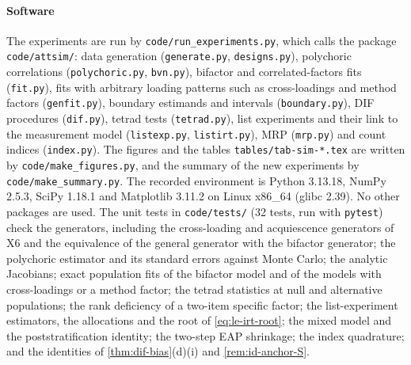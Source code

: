 \paragraph{Software}
The experiments are run by \texttt{code/run\_experiments.py}, which calls the package \texttt{code/attsim/}: data generation (\texttt{generate.py}, \texttt{designs.py}), polychoric correlations (\texttt{polychoric.py}, \texttt{bvn.py}), bifactor and correlated-factors fits (\texttt{fit.py}), fits with arbitrary loading patterns such as cross-loadings and method factors (\texttt{genfit.py}), boundary estimands and intervals (\texttt{boundary.py}), DIF procedures (\texttt{dif.py}), tetrad tests (\texttt{tetrad.py}), list experiments and their link to the measurement model (\texttt{listexp.py}, \texttt{listirt.py}), MRP (\texttt{mrp.py}) and count indices (\texttt{index.py}). The figures and the tables \texttt{tables/tab-sim-*.tex} are written by \texttt{code/make\_figures.py}, and the summary of the new experiments by \texttt{code/make\_summary.py}. The recorded environment is Python 3.13.18, NumPy 2.5.3, SciPy 1.18.1 and Matplotlib 3.11.2 on Linux x86\_64 (glibc 2.39). No other packages are used. The unit tests in \texttt{code/tests/} (32 tests, run with \texttt{pytest}) check the generators, including the cross-loading and acquiescence generators of X6 and the equivalence of the general generator with the bifactor generator; the polychoric estimator and its standard errors against Monte Carlo; the analytic Jacobians; exact population fits of the bifactor model and of the models with cross-loadings or a method factor; the tetrad statistics at null and alternative populations; the rank deficiency of a two-item specific factor; the list-experiment estimators, the allocations and the root of \eqref{eq:le-irt-root}; the mixed model and the poststratification identity; the two-step EAP shrinkage; the index quadrature; and the identities of \cref{thm:dif-bias}(d)(i) and \cref{rem:id-anchor-S}.

